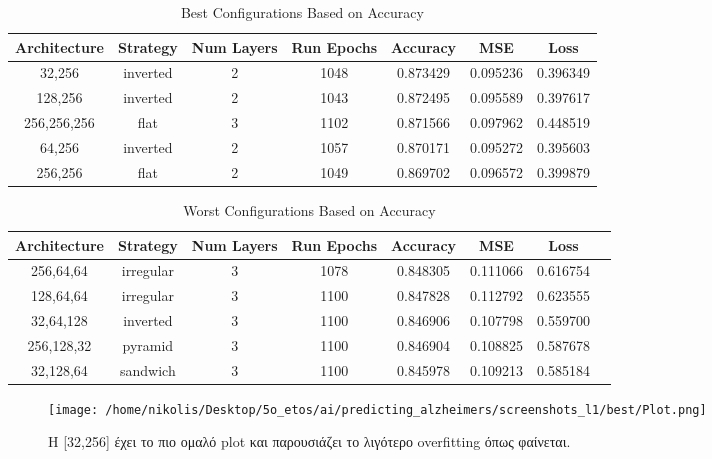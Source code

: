 \documentclass[a4paper,11pt]{article}
\begin{document}
\begin{table}[h!]
    \centering
    \caption{Best Configurations Based on Accuracy}
    \label{tab:top-architectures}
    \begin{tabular}{c c c c c c c}
    \hline
    \textbf{Architecture} & \textbf{Strategy} & \textbf{Num Layers} & \textbf{Run Epochs} & \textbf{Accuracy} & \textbf{MSE} & \textbf{Loss} \\
    \hline
    32,256       & inverted & 2 & 1048 & 0.873429 & 0.095236 & 0.396349 \\
    128,256      & inverted & 2 & 1043 & 0.872495 & 0.095589 & 0.397617 \\
    256,256,256  & flat     & 3 & 1102 & 0.871566 & 0.097962 & 0.448519 \\
    64,256       & inverted & 2 & 1057 & 0.870171 & 0.095272 & 0.395603 \\
    256,256      & flat     & 2 & 1049 & 0.869702 & 0.096572 & 0.399879 \\
    \hline
    \end{tabular}
    \end{table}

\begin{table}[h!]
    \centering
    \caption{Worst Configurations Based on Accuracy}
    \label{tab:worst-configs}
    \begin{tabular}{c c c c c c c c}
    \hline
     \textbf{Architecture} & \textbf{Strategy} & \textbf{Num Layers} & \textbf{Run Epochs} & \textbf{Accuracy} & \textbf{MSE} & \textbf{Loss} \\
    \hline
     256,64,64  & irregular & 3 & 1078 & 0.848305 & 0.111066 & 0.616754 \\
     128,64,64  & irregular & 3 & 1100 & 0.847828 & 0.112792 & 0.623555 \\
     32,64,128  & inverted  & 3 & 1100 & 0.846906 & 0.107798 & 0.559700 \\
     256,128,32 & pyramid   & 3 & 1100 & 0.846904 & 0.108825 & 0.587678 \\
     32,128,64  & sandwich  & 3 & 1100 & 0.845978 & 0.109213 & 0.585184 \\
    \hline
    \end{tabular}
    \end{table}


    \begin{figure}[H]
        \centering
        \texttt{[image: /home/nikolis/Desktop/5o\_etos/ai/predicting\_alzheimers/screenshots\_l1/best/Plot.png]}
        \label{fig:double}
        \caption{Η [32,256] έχει το πιο ομαλό plot και παρουσιάζει το λιγότερο overfitting όπως φαίνεται. }
    \end{figure}  
\end{document}
